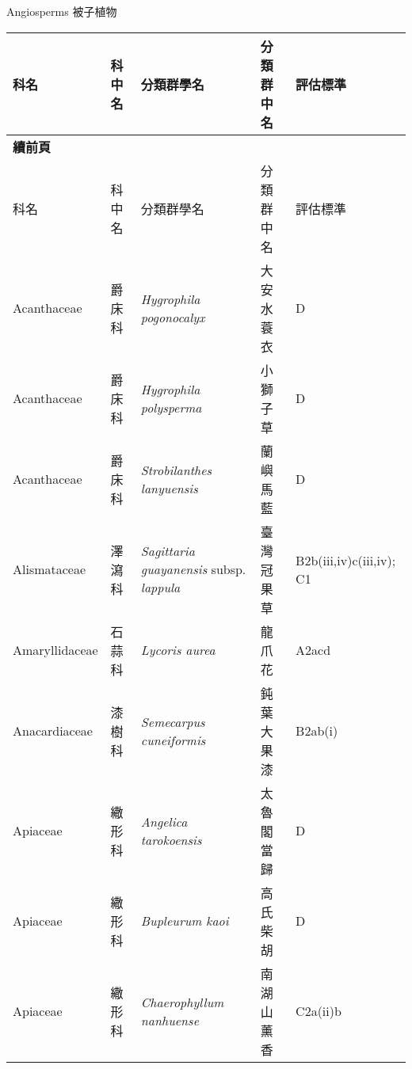 \noindent\normalfont\selectfont Angiosperms 被子植物
\footnotesize\selectfont
        {\def\arraystretch{1.5}\tabcolsep=2pt
        \begin{longtable}{p{2.5cm}p{2.5cm}p{4.5cm}p{2.5cm}p{3cm}}
        \toprule
          科名 & 科中名 & 分類群學名 & 分類群中名 & 評估標準 \\
        \midrule 
        \endfirsthead

        {{\bfseries 續前頁 }} \\
        科名 & 科中名 & 分類群學名 & 分類群中名 & 評估標準 \\
        \midrule
        \endhead
                Acanthaceae & 爵床科 & \textit{Hygrophila pogonocalyx}  & 大安水蓑衣 & D \index{Hygrophila@\textit{Hygrophila}!pogonocalyx@\textit{pogonocalyx}}  \index{大安水蓑衣} \\
    Acanthaceae & 爵床科 & \textit{Hygrophila polysperma}  & 小獅子草 & D \index{Hygrophila@\textit{Hygrophila}!polysperma@\textit{polysperma}}  \index{小獅子草} \\
    Acanthaceae & 爵床科 & \textit{Strobilanthes lanyuensis}  & 蘭嶼馬藍 & D \index{Strobilanthes@\textit{Strobilanthes}!lanyuensis@\textit{lanyuensis}}  \index{蘭嶼馬藍} \\
    Alismataceae & 澤瀉科 & \textit{Sagittaria guayanensis} subsp. \textit{lappula}  & 臺灣冠果草 & B2b(iii,iv)c(iii,iv); C1 \index{Sagittaria@\textit{Sagittaria}!guayanensis@\textit{guayanensis}!subsp. lappula@subsp. \textit{lappula}}  \index{臺灣冠果草} \\
    Amaryllidaceae & 石蒜科 & \textit{Lycoris aurea}  & 龍爪花 & A2acd \index{Lycoris@\textit{Lycoris}!aurea@\textit{aurea}}  \index{龍爪花} \\
    Anacardiaceae & 漆樹科 & \textit{Semecarpus cuneiformis}  & 鈍葉大果漆 & B2ab(i) \index{Semecarpus@\textit{Semecarpus}!cuneiformis@\textit{cuneiformis}}  \index{鈍葉大果漆} \\
    Apiaceae & 繖形科 & \textit{Angelica tarokoensis}  & 太魯閣當歸 & D \index{Angelica@\textit{Angelica}!tarokoensis@\textit{tarokoensis}}  \index{太魯閣當歸} \\
    Apiaceae & 繖形科 & \textit{Bupleurum kaoi}  & 高氏柴胡 & D \index{Bupleurum@\textit{Bupleurum}!kaoi@\textit{kaoi}}  \index{高氏柴胡} \\
    Apiaceae & 繖形科 & \textit{Chaerophyllum nanhuense}  & 南湖山薰香 & C2a(ii)b \index{Chaerophyllum@\textit{Chaerophyllum}!nanhuense@\textit{nanhuense}}  \index{南湖山薰香} \\

\end{longtable}}
